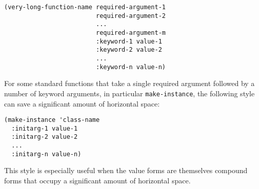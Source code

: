 \begin{verbatim}
(very-long-function-name required-argument-1
                         required-argument-2
                         ...
                         required-argument-m
                         :keyword-1 value-1
                         :keyword-2 value-2
                         ...
                         :keyword-n value-n)
\end{verbatim}

For some standard functions that take a single required argument
followed by a number of keyword arguments, in particular
\texttt{make-instance}, the following style can save a significant
amount of horizontal space:

\begin{verbatim}
(make-instance 'class-name
  :initarg-1 value-1
  :initarg-2 value-2
  ...
  :initarg-n value-n)
\end{verbatim}

This style is especially useful when the value forms are themselves
compound forms that occupy a significant amount of horizontal space.
